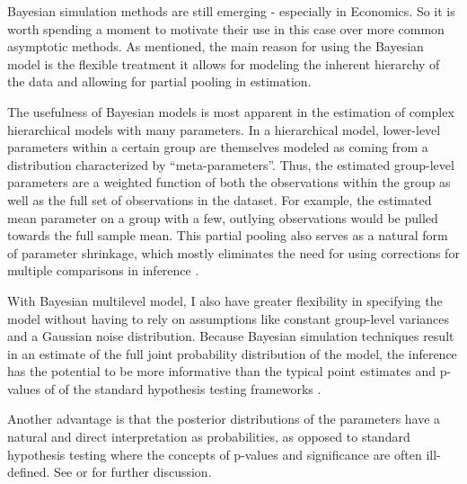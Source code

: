 \documentclass[12pt]{article}
\begin{document}
Bayesian simulation methods are still emerging - especially in Economics. So it is worth spending a moment to motivate their use in this case over more common asymptotic methods. As mentioned, the main reason for using the Bayesian model is the flexible treatment it allows for modeling the inherent hierarchy of the data and allowing for partial pooling in estimation.

The usefulness of Bayesian models is most apparent in the estimation of complex hierarchical models with many parameters.  
In a hierarchical model, lower-level parameters within a certain group are themselves modeled as coming from a distribution characterized by ``meta-parameters''. Thus, the estimated group-level parameters are a weighted function of both the observations within the group as well as the full set of observations in the dataset. For example, the estimated mean parameter on a group with a few, outlying observations would be pulled towards the full sample mean. This partial pooling also serves as a natural form of parameter shrinkage, which mostly eliminates the need for using corrections for multiple comparisons in inference \citep{gelman_data_2006}.

With Bayesian multilevel model, I also have greater flexibility in specifying the model without having to rely on assumptions like constant group-level variances and a Gaussian noise distribution.  Because Bayesian simulation techniques result in an estimate of the full joint probability distribution of the model, the inference has the potential to be more informative than the typical point estimates and p-values of of the standard hypothesis testing frameworks \citep{kruschke_doing_2014}. 

Another advantage is that the posterior distributions of the parameters have a natural and direct interpretation as probabilities, as opposed to standard hypothesis testing where the concepts of p-values and significance are often ill-defined. See \citet{kruschke_doing_2014} or \citet{gelman_bayesian_2013} for further discussion.


\end{document}
